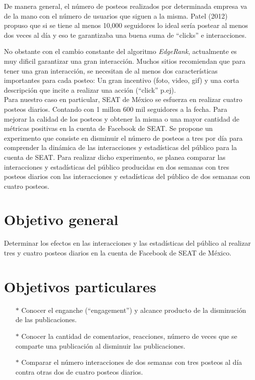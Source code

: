 \documentclass[a4paper,10pt]{article}
\begin{document}
De manera general, el número de posteos realizados por determinada empresa va de la mano
con el número de usuarios que siguen a la misma. Patel (2012) propuso que si se tiene al menos
10,000 seguidores lo ideal sería postear al menos dos veces al día y eso te garantizaba una 
buena suma de ``clicks''  e interacciones.

No obstante con el cambio constante del algoritmo \textit{EdgeRank}, actualmente es
muy dificil garantizar una gran interacción.
Muchos sitios recomiendan que para tener una gran interacción, se necesitan de al menos
dos características importantes para cada posteo: Un gran incentivo (foto, video, gif) 
y una corta descripción que incite a realizar una acción (``click'' p.ej).\\
Para nuestro caso en particular, SEAT  de México se esfuerza en realizar cuatro posteos
diarios. Contando con 1 millon 600 mil seguidores a la fecha.
Para mejorar la calidad de los posteos y obtener la misma o una mayor cantidad de métricas
positivas en la cuenta de Facebook de SEAT.
Se propone un experimento que consiste en disminuir el número de posteos a tres por día para
comprender la dinámica de las interacciones y estadísticas del público  para la cuenta de SEAT.
Para realizar dicho experimento, se planea comparar las interacciones y estadísticas del público 
producidas en dos semanas con tres posteos diarios con las interacciones y estadísticas del público de dos semanas con cuatro posteos.



\section{Objetivo general}
Determinar los efectos en las interacciones y las estadísticas del público al realizar tres y cuatro posteos diarios en la 
cuenta de Facebook de SEAT de México.


\section{Objetivos particulares}
  \begin{itemize}
   \item[$*$] Conocer el enganche (``engagement'') y alcance producto de la disminución de las publicaciones.
   \item[$*$] Conocer la cantidad de comentarios, reacciones, número de veces que se comparte una publicación al disminuir las publicaciones.
   \item[$*$] Comparar el número interacciones de dos semanas con tres posteos al día contra otras dos de  cuatro posteos diarios.
  \end{itemize}
\end{document}
